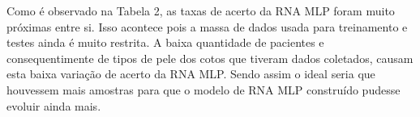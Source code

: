 		Como é observado na Tabela 2, as taxas de acerto da RNA MLP foram muito próximas entre si. Isso acontece pois a massa de dados usada para treinamento e testes ainda é muito restrita. A baixa quantidade de pacientes e consequentimente de tipos de pele dos cotos que tiveram dados coletados, causam esta baixa variação de acerto da RNA MLP. Sendo assim o ideal seria que houvessem mais amostras para que o modelo de RNA MLP construído pudesse evoluir ainda mais. 







